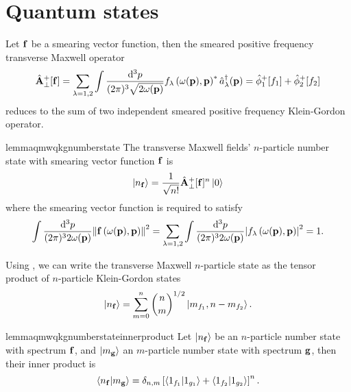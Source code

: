 \section{Quantum states}

\begin{corollary}\label{thm:qmw_qkg}
	Let $\vb{f}$ be a smearing vector function, then the smeared positive frequency transverse Maxwell operator
	\begin{equation}
		\hat{\vb{A}}_\perp^+[\vb{f}]
		=
		\sum_{\lambda=1,2}
		\int\frac{\dd[3]{p}}{(2\pi)^3\sqrt{2\omega(\vb{p})}}
		f_\lambda\left(\omega(\vb{p}),\vb{p}\right)^*
		\hat{a}_\lambda^\dagger(\vb{p})
		=
		\hat\phi_1^+[f_1]
		+
		\hat\phi_2^+[f_2]
	\end{equation}
	 reduces to the sum of two independent smeared positive frequency Klein-Gordon operator.
\end{corollary}
\begin{restatable}{lemma}{qmwqkgnumberstate}\label{thm:qmw_qkg_number_state}
	The transverse Maxwell fields' $n$-particle number state with smearing vector function $\vb{f}$ is
	\begin{equation}
		\label{eq:qmw_number_state}
		\ket{n_{\vb{f}}}
		=
		\frac{1}{\sqrt{n!}}
		\hat{\vb{A}}_\perp^+[\vb{f}]^n
		\ket{0}
	\end{equation}
	where the smearing vector function is required to satisfy~\cite[p.~175]{Itzykson2012}
	\begin{equation}
		\int\frac{\dd[3]{p}}{(2\pi)^32\omega(\vb{p})}
		\norm{\vb{f}\left(\omega(\vb{p}),\vb{p}\right)}^2
		=
		\sum_{\lambda=1,2}
		\int\frac{\dd[3]{p}}{(2\pi)^32\omega(\vb{p})}
		\abs{f_\lambda\left(\omega(\vb{p}),\vb{p}\right)}^2
		=
		1
		.
	\end{equation}
\end{restatable}
\begin{corollary}
	Using , we can write the transverse Maxwell $n$-particle state as the tensor product of $n$-particle Klein-Gordon states
	\begin{equation}
		\ket{n_{\vb{f}}}
		=
		\sum^n_{m=0}
		\binom{n}{m}^{1/2}
		\ket{m_{f_1},n-m_{f_2}}
		.
	\end{equation}
\end{corollary}
\begin{restatable}{lemma}{qmwqkgnumberstateinnerproduct}\label{thm:qmw_qkg_number_state_inner_product}
	Let $\ket{n_{\vb{f}}}$ be an $n$-particle number state with spectrum $\vb{f}$, and $\ket{m_{\vb{g}}}$ an $m$-particle number state with spectrum $\vb{g}$, then their inner product is
	\begin{equation}
		\braket{n_{\vb{f}}}{m_{\vb{g}}}
		=
		\delta_{n,m}
		\left[
			\braket{1_{f_1}}{1_{g_1}}
			+
			\braket{1_{f_2}}{1_{g_2}}
		\right]^n
		.
	\end{equation}
\end{restatable}

